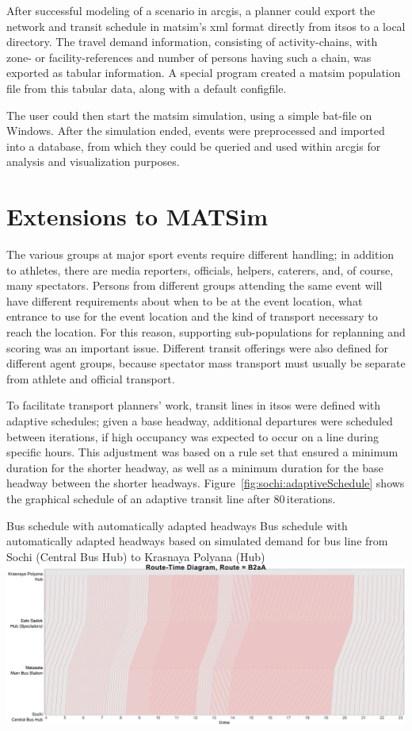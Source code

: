 After successful modeling of a scenario in \gls{arcgis}, a planner could export
the network and transit schedule in \gls{matsim}'s \gls{xml} format directly from \gls{itsos} to a
local directory. The travel demand information, consisting of activity-chains,
with zone- or facility-references and number of persons having such a
chain, was exported as tabular information. A special program created a \gls{matsim}
population file from this tabular data, along with a default \gls{configfile}.

The user could then start the \gls{matsim} simulation, using a simple bat-file
on Windows. After the simulation ended,  events were preprocessed and
imported into a database, from which they could be queried and used within \gls{arcgis}
for analysis and visualization purposes.

\section{Extensions to MATSim}
The various groups at major sport events require different handling;
in addition to athletes, there are media reporters, officials,
helpers, caterers, and, of course, many spectators. Persons from different
groups attending the same event will have different requirements about when
to be at the event location, what entrance to use for the event
location and the kind of transport necessary to reach the location. For this reason,
supporting sub-populations for \gls{replanning} and scoring was an important issue.
Different transit offerings were also defined for different agent groups,
because spectator mass transport must usually be separate from
athlete and official transport.

To facilitate transport planners' work, transit lines in
\gls{itsos} were defined with adaptive schedules; given a base headway,
additional departures were scheduled between iterations, if high
occupancy was expected to occur on a line during specific hours. This adjustment was based
on a rule set that ensured a minimum duration for the shorter headway, as well
as a minimum duration for the base headway between the shorter headways.
Figure~\ref{fig:sochi:adaptiveSchedule} shows the graphical schedule of an
adaptive transit line after 80\,iterations.

\createfigure%
{Bus schedule with automatically adapted headways}%
{Bus schedule with automatically adapted headways based on simulated demand for
bus line from Sochi (Central Bus Hub) to Krasnaya Polyana (Hub)}%
{\label{fig:sochi:adaptiveSchedule}}%
{\includegraphics[width=1.\textwidth,angle=0]{./scenarios/figures/sochi_adaptiveSchedule.pdf}}%
{}

